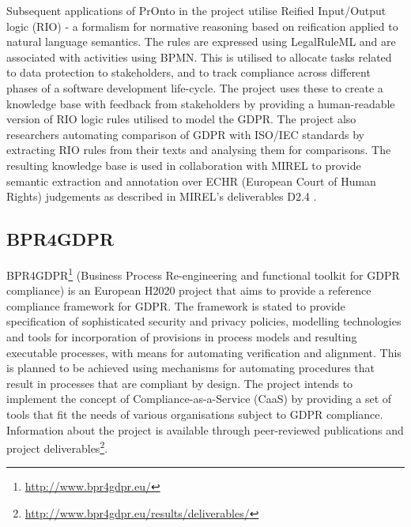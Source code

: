 Subsequent applications of PrOnto in the project utilise Reified Input/Output logic (RIO) \cite{robaldo_reified_2017} - a formalism for normative reasoning based on reification applied to natural language semantics. The rules are expressed using LegalRuleML and are associated with activities using BPMN. This is utilised to allocate tasks related to data protection to stakeholders, and to track compliance across different phases of a software development life-cycle.
The project uses these to create a knowledge base \cite{bartolini_agile_2019} with feedback from stakeholders by providing a human-readable version of RIO logic rules utilised to model the GDPR. 
The project also researchers automating comparison of GDPR with
ISO/IEC standards by extracting RIO rules from their texts and analysing them for comparisons.
The resulting knowledge base is used in collaboration with MIREL to provide semantic extraction and annotation over ECHR (European Court of Human Rights) judgements \cite{cardellino_legal_2017} as described in MIREL's deliverables D2.4 \cite{robaldo_livio_d2.4_2017}.

\subsection*{BPR4GDPR}\label{sec:sota:BPR4GDPR}
BPR4GDPR\footnote{\url{http://www.bpr4gdpr.eu/}} (Business Process Re-engineering and functional toolkit for GDPR compliance) is an European H2020 project that aims to provide a reference compliance framework for GDPR. The framework is stated to provide specification of sophisticated security and privacy policies, modelling technologies and tools for incorporation of provisions in process models and resulting executable processes, with means for automating verification and alignment.
This is planned to be achieved using mechanisms for automating
procedures that result in processes that are compliant by design.
The project intends to implement the concept of Compliance-as-a-Service (CaaS) by providing a set of tools that fit the needs of various organisations subject to GDPR compliance.
Information about the project is available through peer-reviewed publications and project deliverables\footnote{\url{http://www.bpr4gdpr.eu/results/deliverables/}}.

